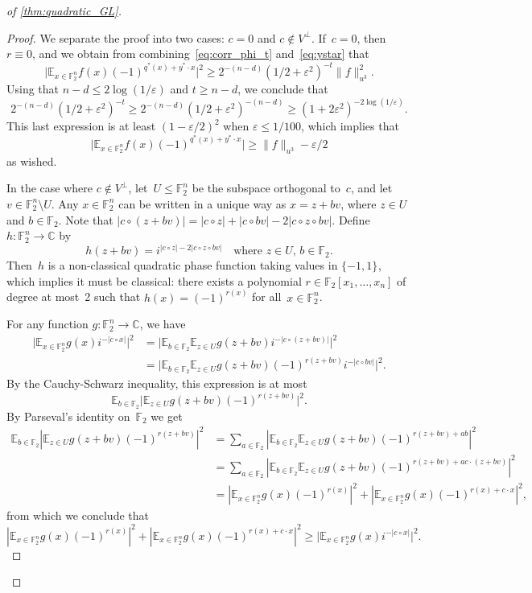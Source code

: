 \documentclass[10pt,a4paper]{amsart}
\newcommand{\C}{\mathbb{C}} %
\newcommand{\E}{\mathbb{E}}
\newcommand{\F}{\mathbb{F}} %
\newcommand{\eps}{\varepsilon}
\newcommand{\pmset}[1]{\{-1,1\}^{#1}} %
\begin{document}
\begin{proof}[ of \cref{thm:quadratic_GL}]
\begin{proof}
We separate the proof into two cases:
$c=0$ and $c\notin V^{\perp}$.
If~$c=0$, then $r\equiv 0$, and we obtain from combining~\eqref{eq:corr_phi_t} and~\eqref{eq:ystar} that
$$\big|\E_{x\in \F_2^n} f(x) (-1)^{q^*(x) + y^* \cdot x}\big|^2 \geq 2^{-(n-d)} (1/2+\eps^2)^{-t} \|f\|_{u^3}^2.$$
Using that $n-d \leq 2\log(1/\eps)$ and $t\geq n-d$, we conclude that
$$2^{-(n-d)} (1/2+\eps^2)^{-t} \geq 2^{-(n-d)} (1/2+\eps^2)^{-(n-d)} \geq (1+2\eps^2)^{-2\log(1/\eps)}.$$
This last expression is at least $(1-\eps/2)^2$ when $\eps \leq 1/100$, which implies that
$$\big|\E_{x\in \F_2^n} f(x) (-1)^{q^*(x) + y^* \cdot x}\big| \geq \|f\|_{u^3} - \eps/2$$
as wished.

In the case where $c\notin V^{\perp}$, let~$U \leq \F_2^n$ be the subspace orthogonal to~$c$, and let~$v \in \F_2^n\setminus U$.
Any $x\in \F_2^n$ can be written in a unique way as $x = z+bv$, where $z\in U$ and $b\in \F_2$.
Note that $|c\circ (z+bv)| = |c\circ z| + |c\circ bv| - 2|c\circ z\circ bv|$.
Define $h:\F_2^n\to \C$ by
$$h(z+bv) = i^{|c\circ z|  - 2|c\circ z\circ bv|} \quad \text{where $z\in U$, $b\in \F_2$.}$$
Then~$h$ is a non-classical quadratic phase function taking values in $\pmset{}$, which implies it must be classical:
there exists a polynomial $r\in \F_2[x_1,\dots,x_n]$ of degree at most~2 such that $h(x) = (-1)^{r(x)}$ for all~$x\in \F_2^n$.

For any function $g: \F_2^n \to \C$, we have
\begin{align*}
    \big|\E_{x\in \F_2^n} g(x) i^{-|c\circ x|}\big|^2
    &= \big|\E_{b\in \F_2} \E_{z\in U} g(z+bv) i^{-|c\circ (z+bv)|} \big|^2 \\
    &= \big|\E_{b\in \F_2} \E_{z\in U} g(z+bv) (-1)^{r(z+bv)} i^{-|c\circ bv|} \big|^2.
\end{align*}
By the Cauchy-Schwarz inequality, this expression is at most
\begin{equation*}
    \E_{b\in \F_2}\big|\E_{z\in U} g(z+bv)(-1)^{r(z+bv)}\big|^2.
\end{equation*}
By Parseval's identity on~$\F_2$ we get
\begin{align*}
    \E_{b\in \F_2} |\E_{z\in U} g(z+bv) (-1)^{r(z+bv)}|^2
    &= \sum_{a\in \F_2} |\E_{b\in \F_2} \E_{z\in U} g(z+bv) (-1)^{r(z+bv) + ab}|^2 \\
    &= \sum_{a\in \F_2} |\E_{b\in \F_2} \E_{z\in U} g(z+bv) (-1)^{r(z+bv) + a c\cdot (z+bv)}|^2 \\
    &= |\E_{x\in \F_2^n} g(x)(-1)^{r(x)}|^2 + |\E_{x\in \F_2^n} g(x) (-1)^{r(x) + c\cdot x}|^2,
\end{align*}
from which we conclude that
$$|\E_{x\in \F_2^n} g(x)(-1)^{r(x)}|^2 + |\E_{x\in \F_2^n} g(x) (-1)^{r(x) + c\cdot x}|^2 \geq \big|\E_{x\in \F_2^n} g(x) i^{-|c\circ x|}\big|^2.$$


\end{proof}
\end{proof}
\end{document}
